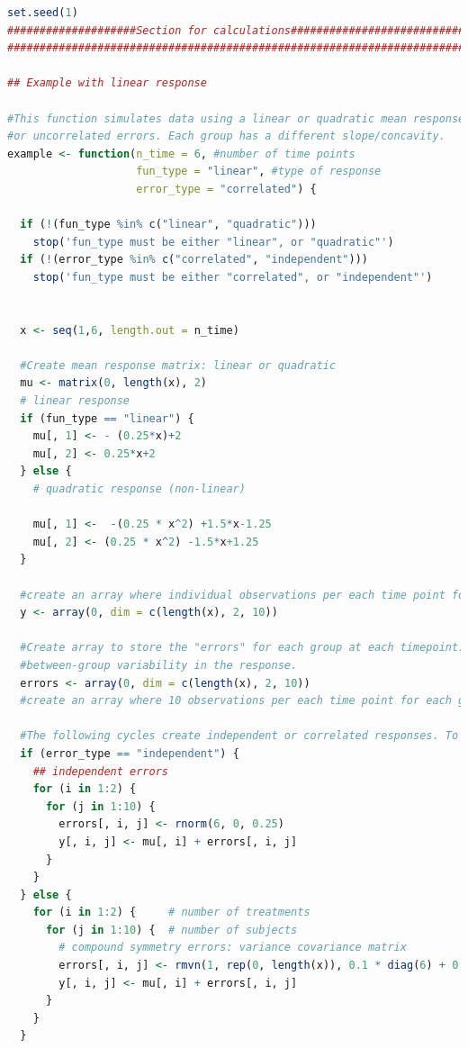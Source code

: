 \documentclass[
]{article}
\begin{document}
\begin{lstlisting}[language=R]
set.seed(1)
####################Section for calculations######################################
################################################################################

## Example with linear response

#This function simulates data using a linear or quadratic mean response and each with correlated
#or uncorrelated errors. Each group has a different slope/concavity.
example <- function(n_time = 6, #number of time points
                    fun_type = "linear", #type of response
                    error_type = "correlated") {
  
  if (!(fun_type %in% c("linear", "quadratic")))
    stop('fun_type must be either "linear", or "quadratic"')
  if (!(error_type %in% c("correlated", "independent")))
    stop('fun_type must be either "correlated", or "independent"')
  
  
  x <- seq(1,6, length.out = n_time)
  
  #Create mean response matrix: linear or quadratic
  mu <- matrix(0, length(x), 2)
  # linear response
  if (fun_type == "linear") {
    mu[, 1] <- - (0.25*x)+2  
    mu[, 2] <- 0.25*x+2
  } else {
    # quadratic response (non-linear)
    
    mu[, 1] <-  -(0.25 * x^2) +1.5*x-1.25
    mu[, 2] <- (0.25 * x^2) -1.5*x+1.25
  }
  
  #create an array where individual observations per each time point for each group are to be stored. Currently using 10 observations per timepoint
  y <- array(0, dim = c(length(x), 2, 10))
  
  #Create array to store the "errors" for each group at each timepoint. The "errors" are the 
  #between-group variability in the response.
  errors <- array(0, dim = c(length(x), 2, 10))
  #create an array where 10 observations per each time point for each group are to be stored
  
  #The following cycles create independent or correlated responses. To each value of mu (mean response per group) a randomly generated error (correlated or uncorrelated) is added and thus the individual response is created.
  if (error_type == "independent") {
    ## independent errors
    for (i in 1:2) {
      for (j in 1:10) {
        errors[, i, j] <- rnorm(6, 0, 0.25)
        y[, i, j] <- mu[, i] + errors[, i, j]
      }
    }
  } else {
    for (i in 1:2) {     # number of treatments
      for (j in 1:10) {  # number of subjects
        # compound symmetry errors: variance covariance matrix
        errors[, i, j] <- rmvn(1, rep(0, length(x)), 0.1 * diag(6) + 0.25 * matrix(1, 6, 6))
        y[, i, j] <- mu[, i] + errors[, i, j]
      }
    }
  }    
  

\end{lstlisting}
\end{document}
